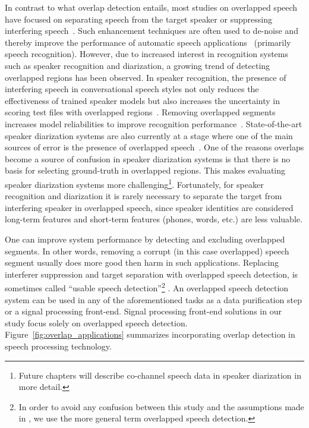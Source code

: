 In contrast to what overlap detection entails, most studies on overlapped speech have focused on separating speech from the target speaker or suppressing interfering speech~\cite{morgan_cochannel}. 
Such enhancement techniques are often used to de-noise and thereby improve the performance of automatic speech applications~\cite{Quat_Dan_cch_sup,Chazan_93,cooke20101} (primarily speech recognition). 
However, due to increased interest in recognition systems such as speaker recognition and diarization, a growing trend of detecting overlapped regions has been observed. 
In speaker recognition, the presence of interfering speech in conversational speech styles not only reduces the effectiveness of trained speaker models but also increases the uncertainty in scoring test files with overlapped regions~\cite{yantorno_report}. 
Removing overlapped segments increases model reliabilities to improve recognition performance~\cite{shokouhi2015}.    
State-of-the-art speaker diarization systems are also currently at a stage where one of the main sources of error is the presence of overlapped speech~\cite{Boakye_icassp_08,zelenak12Trans}. 
One of the reasons overlaps become a source of confusion in speaker diarization systems is that there is no basis for selecting ground-truth in overlapped regions. 
This makes evaluating speaker diarization systems more challenging\footnote{Future chapters will describe co-channel speech data in speaker diarization in more detail.}. 
Fortunately, for speaker recognition and diarization it is rarely necessary to separate the target from interfering speaker in overlapped speech, since speaker identities are considered long-term features and short-term features (phones, words, etc.) are less valuable. 

One can improve system performance by detecting and excluding overlapped segments. 
In other words, removing a corrupt (in this case overlapped) speech segment usually does more good then harm in such applications. Replacing interferer suppression and target separation with overlapped speech detection, is sometimes called ``usable speech detection''\footnote{In order to avoid any confusion between this study and the assumptions made in \cite{yantorno_report}, we use the more general term overlapped speech detection.} \cite{yantorno_report}. 
An overlapped speech detection system can be used in any of the aforementioned tasks as a data purification step or a signal processing front-end. 
Signal processing front-end solutions in our study focus solely on overlapped speech detection. 
Figure~\ref{fig:overlap_applications} summarizes incorporating overlap detection in speech processing technology. 


